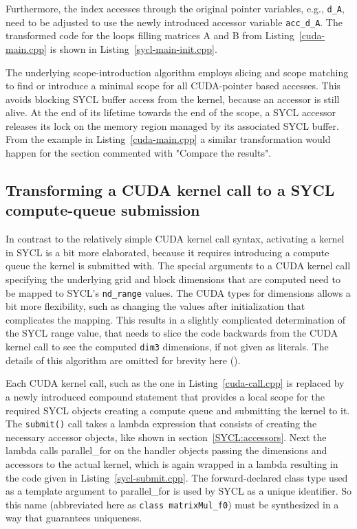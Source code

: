 \documentclass[sigconf]{acmart}
\newcommand{\inputcode}[2]{}
\newcommand{\inputsycl}[2]{}
\newcommand{\tcode}[1]{\texttt{#1}}
\begin{document}
Furthermore, the index accesses through the original pointer variables, e.g., \tcode{d_A}, need to be adjusted to use the newly introduced accessor variable \tcode{acc_d_A}. The transformed code for the loops filling matrices A and B from Listing~\ref{cuda-main.cpp} is shown in Listing~\ref{sycl-main-init.cpp}.
\inputsycl{sycl-main-init.cpp}{Introducing scope for SYCL accessors}


The underlying scope-introduction algorithm employs slicing and scope matching to find or introduce a minimal scope for all CUDA-pointer based accesses. This avoids blocking SYCL buffer access from the kernel, because an accessor is still alive. At the end of its lifetime towards the end of the scope, a SYCL accessor releases its lock on the memory region managed by its associated SYCL buffer. From the example in Listing~\ref{cuda-main.cpp} a similar transformation would happen for the section commented with "Compare the results".

\subsection{Transforming a CUDA kernel call to a SYCL compute-queue submission} 

In contrast to the relatively simple CUDA kernel call syntax, activating a kernel in SYCL is a bit more elaborated, because it requires introducing a compute queue the kernel is submitted with. The special arguments to a CUDA kernel call specifying the underlying grid and block dimensions that are computed need to be mapped to SYCL's \tcode{nd_range} values. The CUDA types for dimensions allows a bit more flexibility, such as changing the values after initialization that complicates the mapping. This results in a slightly complicated determination of the SYCL range value, that needs to slice the code backwards from the CUDA kernel call to see the computed \tcode{dim3} dimensions, if not given as literals. The details of this algorithm are omitted for brevity here (\cite{stauberCUDASYCL2018}).

Each CUDA kernel call, such as the one in Listing~\ref{cuda-call.cpp} is replaced by a newly introduced compound statement that provides a local scope for the required SYCL objects creating a compute queue and submitting the kernel to it. 
The \tcode{submit()} call takes a lambda expression that consists of creating the necessary accessor objects, like shown in section~\ref{SYCL:accessors}. Next the lambda calls parallel_for on the handler objects passing the dimensions and accessors to the actual kernel, which is again wrapped in a lambda resulting in the code given in Listing~\ref{sycl-submit.cpp}. The forward-declared class type used as a template argument to parallel_for is used by SYCL as a unique identifier. So this name (abbreviated here as \tcode{class matrixMul_f0}) must be synthesized in a way that guarantees uniqueness. 
\inputcode{cuda-matrix-call.cpp}{Kernel call to be transformed}
\inputsycl{sycl-submit.cpp}{Submitting transformed kernel}
\end{document}
